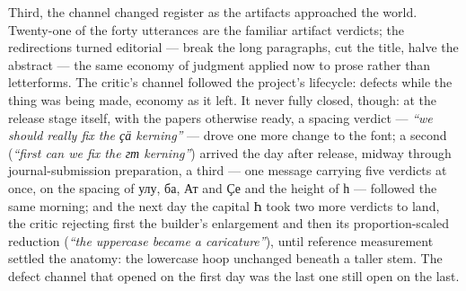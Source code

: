 \documentclass[11pt]{article}
\newcommand{\cz}[1]{{\chu #1}}
\begin{document}
Third, the channel changed register as the artifacts approached the world. Twenty-one of the forty utterances are the familiar artifact verdicts; the redirections turned editorial — break the long paragraphs, cut the title, halve the abstract — the same economy of judgment applied now to prose rather than letterforms. The critic's channel followed the project's lifecycle: defects while the thing was being made, economy as it left. It never fully closed, though: at the release stage itself, with the papers otherwise ready, a spacing verdict — \emph{``we should really fix the \cz{ҫӓ} kerning''} — drove one more change to the font; a second (\emph{``first can we fix the \cz{гт} kerning''}) arrived the day after release, midway through journal-submission preparation, a third — one message carrying five verdicts at once, on the spacing of \cz{улу}, \cz{ба}, \cz{Ат} and \cz{Ҫе} and the height of \cz{һ} — followed the same morning; and the next day the capital \cz{Һ} took two more verdicts to land, the critic rejecting first the builder's enlargement and then its proportion-scaled reduction (\emph{``the uppercase became a caricature''}), until reference measurement settled the anatomy: the lowercase hoop unchanged beneath a taller stem. The defect channel that opened on the first day was the last one still open on the last.
\end{document}
